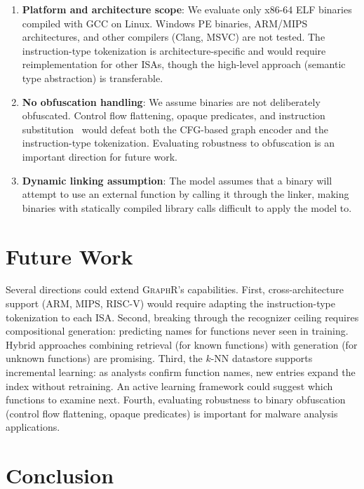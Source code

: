 \documentclass[sigconf,nonacm]{acmart}
\newcommand{\sysname}{\textsc{GraphR}}
\begin{document}
\begin{enumerate}
    \item \textbf{Platform and architecture scope}: We evaluate only x86-64 ELF binaries compiled with GCC on Linux. Windows PE binaries, ARM/MIPS architectures, and other compilers (Clang, MSVC) are not tested. The instruction-type tokenization is architecture-specific and would require reimplementation for other ISAs, though the high-level approach (semantic type abstraction) is transferable.

    \item \textbf{No obfuscation handling}: We assume binaries are not deliberately obfuscated. Control flow flattening, opaque predicates, and instruction substitution~\cite{collberg} would defeat both the CFG-based graph encoder and the instruction-type tokenization. Evaluating robustness to obfuscation is an important direction for future work.

    \item \textbf{Dynamic linking assumption}: The model assumes that a binary will attempt to use an external function by calling it through the linker, making binaries with statically compiled library calls difficult to apply the model to.
\end{enumerate}

\section{Future Work}
\label{sec:future}

Several directions could extend \sysname{}'s capabilities. First, cross-architecture support (ARM, MIPS, RISC-V) would require adapting the instruction-type tokenization to each ISA. Second, breaking through the recognizer ceiling requires compositional generation: predicting names for functions never seen in training. Hybrid approaches combining retrieval (for known functions) with generation (for unknown functions) are promising. Third, the $k$-NN datastore supports incremental learning: as analysts confirm function names, new entries expand the index without retraining. An active learning framework could suggest which functions to examine next. Fourth, evaluating robustness to binary obfuscation (control flow flattening, opaque predicates) is important for malware analysis applications.

\section{Conclusion}
\label{sec:conclusion}
\end{document}
